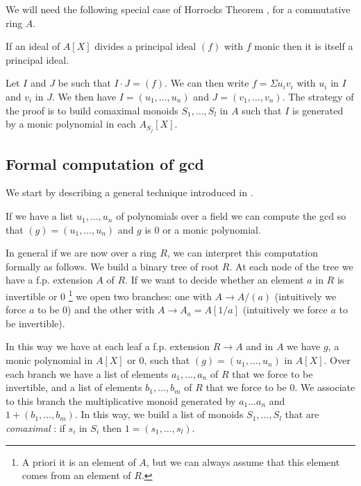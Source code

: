 We will need the following special case of Horrocks Theorem \cite{Lam,lombardi-quitte},
for a commutative ring $A$.

\begin{lemma}\label{Horrocks}
  If an ideal of $A[X]$ divides a principal ideal $(f)$ with $f$ monic then it is itself a principal ideal.
\end{lemma}

Let $I$ and $J$ be such that $I\cdot J = (f)$. We can then write $f = \Sigma u_iv_i$ with $u_i$ in $I$ and
$v_i$ in $J$. We then have $I = (u_1,\dots,u_n)$ and $J=(v_1,\dots,v_n)$.
The strategy of the proof is to build comaximal monoids $S_1,\dots,S_l$ in $A$ \cite{lombardi-quitte} such
that $I$ is generated by a monic polynomial in each $A_{S_j}[X]$.

\subsection{Formal computation of gcd}

 We start by describing a general technique introduced in \cite{lombardi-quitte}.

If we have a list $u_1,\dots,u_n$ of polynomials over a field we can compute the gcd
so that $(g) = (u_1,\dots,u_n)$ and $g$ is $0$ or a monic polynomial.

In general if we are now over a ring $R$, we can interpret this computation formally as
follows. We build a binary tree of root $R$. At each node of the tree we have a f.p. extension $A$
of $R$. If we want to decide whether an element $a$ in $R$ is invertible or $0$
\footnote{A priori it is an element
of $A$, but we can always assume that this element comes from an element of $R$.}
we open two branches: one with $A\rightarrow A/(a)$ (intuitively we force $a$ to be $0$)
and the other with $A\rightarrow A_a = A[1/a]$ (intuitively we force $a$ to be invertible).

In this way we have at each leaf a f.p. extension $R\rightarrow A$ and in $A$ we have
$g$, a monic polynomial in $A[X]$ or $0$, such that $(g) = (u_1,\dots,u_n)$ in $A[X]$.
Over each branch we have a list of elements $a_1,\dots,a_n$ of $R$ that we force to be
invertible, and a list of elements $b_1,\dots,b_m$ of $R$ that we force to be $0$.
We associate to this branch the multiplicative monoid generated by $a_1\dots a_n$
and $1 + (b_1,\dots,b_m)$. In this way, we build a list of monoids $S_1,\dots,S_l$
that are {\em comaximal} \cite{lombardi-quitte}: if $s_i$ in $S_i$ then $1 = (s_1,\dots,s_l)$.

